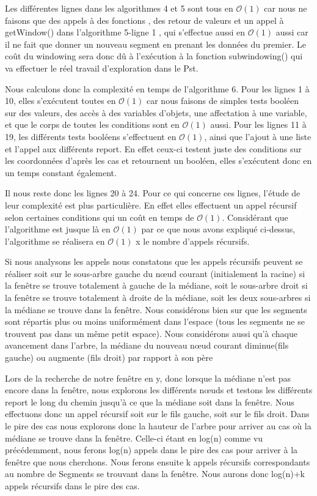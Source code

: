 \documentclass[10pt,a4paper]{article}
\begin{document}
Les différentes lignes dans les algorithmes 4 et 5 sont tous en $\mathcal{O}(1)$ car nous ne faisons que des appels à des fonctions , des retour de valeurs et un appel à getWindow() dans l'algorithme 5-ligne 1 , qui s'effectue aussi en $\mathcal{O}(1)$ aussi car il ne fait que donner un nouveau segment en prenant les données du premier. Le coût du windowing sera donc dû à l’exécution à la fonction subwindowing() qui va effectuer le réel travail d'exploration dans le Pst.

Nous calculons donc la complexité en temps de l'algorithme 6.
Pour les lignes 1 à 10, elles s’exécutent toutes en $\mathcal{O}(1)$ car nous faisons de simples tests booléen sur des valeurs, des accès à des variables d'objets, une affectation à une variable, et que le corps de toutes les conditions sont en $\mathcal{O}(1)$ aussi.
Pour les lignes 11 à 19, les différents tests booléens s'effectuent en $\mathcal{O}(1)$, ainsi que l'ajout à une liste et l'appel aux différents report. En effet ceux-ci testent juste des conditions sur les coordonnées d'après les cas et retournent un booléen, elles s’exécutent donc en un temps constant également.

Il nous reste donc les lignes 20 à 24. Pour ce qui concerne ces lignes, l'étude de leur complexité est plus particulière. En effet elles effectuent un appel récursif selon certaines conditions qui un coût en temps de $\mathcal{O}(1)$.
Considérant que l'algorithme est jusque là en $\mathcal{O}(1)$ par ce que nous avons expliqué ci-dessus, l'algorithme se réalisera en $\mathcal{O}(1)$ x le nombre d'appels récursifs.

Si nous analysons les appels nous constatons que les appels récursifs peuvent se réaliser soit sur le sous-arbre gauche du nœud courant (initialement la racine) si la fenêtre se trouve totalement à gauche de la médiane, soit le sous-arbre droit si la fenêtre se trouve totalement à droite de la médiane, soit les deux sous-arbres si la médiane se trouve dans la fenêtre. Nous considérons bien sur que les segments sont répartis plus ou moins uniformément dans l'espace (tous les segments ne se trouvent pas dans un même petit espace). Nous considérons aussi qu'à chaque avancement dans l'arbre, la médiane du nouveau nœud courant diminue(fils gauche) ou augmente (fils droit) par rapport à son père

Lors de la recherche de notre fenêtre en y, donc lorsque la médiane n'est pas encore dans la fenêtre, nous explorons les différents nœuds et testons les différents report le long du chemin jusqu'à ce que la médiane soit dans la fenêtre. Nous effectuons donc un appel récursif soit sur le fils gauche, soit sur le fils droit. Dans le pire des cas nous explorons donc la hauteur de l'arbre pour arriver au cas où la médiane se trouve dans la fenêtre. Celle-ci étant en log(n) comme vu précédemment, nous ferons log(n) appels dans le pire des cas pour arriver à la fenêtre que nous cherchons. Nous ferons ensuite k appels récursifs correspondants au nombre de Segments se trouvant dans la fenêtre. Nous aurons donc log(n)+k appels récursifs dans le pire des cas.
\end{document}
